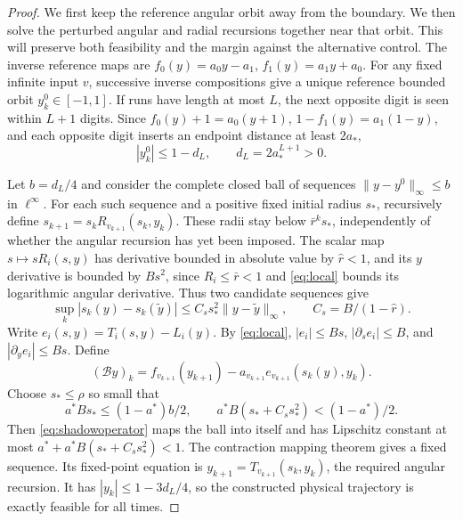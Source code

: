 \documentclass[11pt]{amsart}
\theoremstyle{definition}
\theoremstyle{remark}
\numberwithin{equation}{section}
\begin{document}
\begin{proof}
We first keep the reference angular orbit away from the boundary.
We then solve the perturbed angular and radial recursions together
near that orbit. This will preserve both feasibility and the margin
against the alternative control.
The inverse reference maps are
\(f_0(y)=a_0y-a_1\), \(f_1(y)=a_1y+a_0\).
For any fixed infinite input \(v\), successive inverse compositions
give a unique reference bounded orbit \(y_k^0\in[-1,1]\).
If runs have length at most \(L\), the next opposite digit is seen
within \(L+1\) digits. Since
\(f_0(y)+1=a_0(y+1)\), \(1-f_1(y)=a_1(1-y)\), and each opposite
digit inserts an endpoint distance at least \(2a_*\),
\begin{equation}
|y_k^0|\le1-d_L,
              \qquad d_L=2a_*^{L+1}>0.                     \label{eq:refmargin}
\end{equation}

Let \(b=d_L/4\) and consider the complete closed ball of sequences
\(\|y-y^0\|_\infty\le b\) in \(\ell^\infty\).
For each such sequence and a positive fixed initial radius \(s_*\),
recursively define \(s_{k+1}=s_kR_{v_{k+1}}(s_k,y_k)\).
These radii stay below \(\bar r^ks_*\), independently of whether
the angular recursion has yet been imposed.
The scalar map \(s\mapsto sR_i(s,y)\) has derivative bounded in
absolute value by \(\widehat r<1\), and its \(y\) derivative is
bounded by \(B s^2\), since \(R_i\le\bar r<1\) and \eqref{eq:local} bounds
its logarithmic angular derivative. Thus two candidate sequences give
\begin{equation}
\sup_k|s_k(y)-s_k(\widetilde y)|
       \le C_s s_*^2\|y-\widetilde y\|_\infty,
       \qquad C_s=B/(1-\widehat r).                         \label{eq:radialdependence}
\end{equation}
Write \(e_i(s,y)=T_i(s,y)-L_i(y)\). By \eqref{eq:local},
\(|e_i|\le Bs\), \(|\partial_s e_i|\le B\), and
\(|\partial_y e_i|\le Bs\). Define
\begin{equation}
(\mathcal By)_k=f_{v_{k+1}}(y_{k+1})
         -a_{v_{k+1}}e_{v_{k+1}}(s_k(y),y_k).               \label{eq:shadowoperator}
\end{equation}
Choose \(s_*\le\rho\) so small that
\begin{equation}
a^*Bs_*\le(1-a^*)b/2,
 \qquad a^*B(s_*+C_s s_*^2)<(1-a^*)/2.                     \label{eq:shadowbounds}
\end{equation}
Then \eqref{eq:shadowoperator} maps the ball into itself and has Lipschitz constant at
most \(a^*+a^*B(s_*+C_s s_*^2)<1\).
The contraction mapping theorem gives a fixed sequence. Its fixed-point
equation is \(y_{k+1}=T_{v_{k+1}}(s_k,y_k)\), the required angular
recursion. It has \(|y_k|\le1-3d_L/4\), so the constructed
physical trajectory is exactly feasible for all times.


\end{proof}
\end{document}
